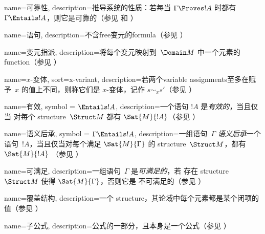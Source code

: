 

 {
  name=可靠性,
  description={推导系统的性质：若每当
    $\Gamma \Proves !A$ 时都有 $\Gamma \Entails !A$，则它是可靠的（参见
     和 ）} }


 {
  name=语句,
  description={不含\gls{free}变元的\gls{formula}（参见
    ）} }

 {
  name=变元指派,
  description={将每个{变元}映射到~$\Domain M$ 中一个元素的 \gls{function}（参见 ）} }

 {
  name=$x$-变体,
  sort={x-variant},
  description={若两个\glspl{variable assignment}至多在赋予~$x$ 的值上不同，则称它们是 $x$-变体，记作 $s \sim_x
    s'$（参见
    ）} }

 {
  name=有效,
  symbol = {\ensuremath{\Entails !A}},
  description={一个语句 $!A$ 是\emph{有效的}，当且仅当
    对每个 \gls{structure}~$\Struct M$ 都有 $\Sat{M}{!A}$（参见
    ）} }

 {
  name=语义后承,
  symbol = {\ensuremath{\Gamma \Entails !A}},
  description={一组语句~$\Gamma$ \emph{语义后承}一个
    语句~$!A$，当且仅当对每个满足 $\Sat{M}{\Gamma}$ 的
    \gls{structure}~$\Struct M$，都有 $\Sat{M}{!A}$
    （参见 ）} }

 {
  name=可满足,
  description={一组语句~$\Gamma$ 是\emph{可满足的}，若
    存在 \gls{structure}~$\Struct M$ 使得 $\Sat{M}{\Gamma}$，否则它是
    不可满足的（参见 ）} }

 {
    name=覆盖结构,
    description={一个 \gls{structure}，其论域中每个元素都是某个闭项的值（参见
      ）} }

 {
  name={子公式},
  description={公式的一部分，且本身是一个公式（参见
    ）} }


